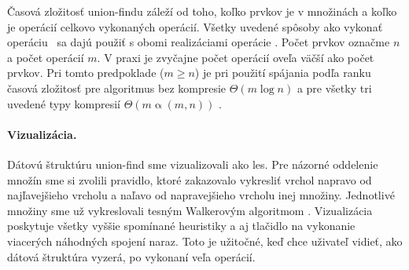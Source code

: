 Časová zložitosť union-findu záleží od toho, koľko prvkov je v množinách a koľko je 
operácií celkovo vykonaných operácií. Všetky uvedené spôsoby ako vykonať 
operáciu \find\ sa dajú použiť s obomi realizáciami operácie \union. 
Počet prvkov označme $n$ a počet operácií $m$. V praxi je zvyčajne počet 
operácií oveľa väčší ako počet prvkov. Pri tomto predpoklade ($m\geq n$) je 
pri použití spájania podľa ranku časová zložitosť pre algoritmus bez kompresie 
$\Theta(m\log n)$ a pre všetky tri uvedené typy kompresií 
$\Theta(m\mathop{\alpha}(m,n))$ \citep{paths2}.

\paragraph{Vizualizácia.}
Dátovú štruktúru union-find sme vizualizovali ako les. Pre názorné 
oddelenie množín sme si zvolili pravidlo, ktoré zakazovalo vykresliť vrchol 
napravo od najľavejšieho vrcholu a naľavo od napravejšieho vrcholu inej 
množiny. Jednotlivé množiny sme už vykreslovali tesným Walkerovým algoritmom 
\citep{walker}. Vizualizácia poskytuje všetky vyššie spomínané heuristiky a 
aj tlačidlo na vykonanie viacerých náhodných spojení naraz. Toto je užitočné, 
keď chce uživateľ vidieť, ako dátová štruktúra vyzerá, po vykonaní 
veľa operácií.




